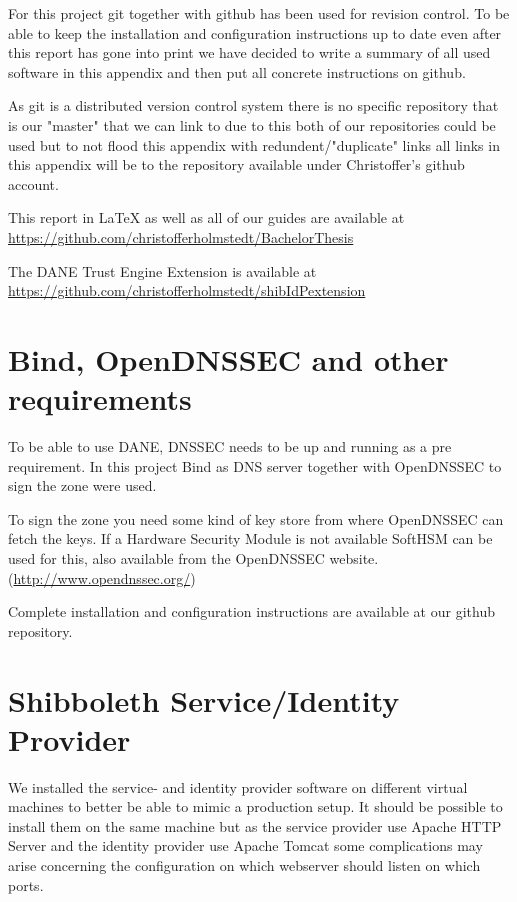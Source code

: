 For this project git together with github has been used for revision control.
To be able to keep the installation and configuration instructions up to date even after this report has gone into print we have decided to write a summary of all used software in this appendix and then put all concrete instructions on github.

As git is a distributed version control system there is no specific repository that is our "master" that we can link to due to this both of our repositories could be used but to not flood this appendix with redundent/"duplicate" links all links in this appendix will be to the repository available under Christoffer's github account.

This report in LaTeX as well as all of our guides are available at \\
\url{https://github.com/christofferholmstedt/BachelorThesis}

The DANE Trust Engine Extension is available at \\
\url{https://github.com/christofferholmstedt/shibIdPextension}

\section{Bind, OpenDNSSEC and other requirements}
To be able to use DANE, DNSSEC needs to be up and running as a pre requirement.
In this project Bind as DNS server together with OpenDNSSEC to sign the zone were used.

To sign the zone you need some kind of key store from where OpenDNSSEC can fetch the keys.
If a Hardware Security Module is not available SoftHSM can be used for this, also available from the OpenDNSSEC website.
(\url{http://www.opendnssec.org/})

Complete installation and configuration instructions are available at our github repository.

\section{Shibboleth Service/Identity Provider}
We installed the service- and identity provider software on different virtual machines to better be able to mimic a production setup.
It should be possible to install them on the same machine but as the service provider use Apache HTTP Server and the identity provider use Apache Tomcat some complications may arise concerning the configuration on which webserver should listen on which ports.

